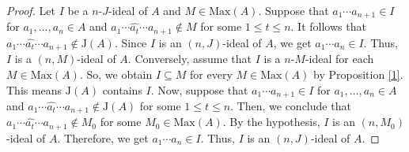 \documentclass[preprint,review,10pt]{amsart}
\theoremstyle{definition}
\theoremstyle{remark}
\numberwithin{equation}{section}
\begin{document}
\begin{proof}
Let $I$ be a $n$-$J$-ideal of $A$ and $M \in \text{Max}(A)$. Suppose that $a_1\cdots a_{n+1} \in I$ for $a_1,\ldots,a_n \in A$ and $a_1\cdots \widehat{a_t} \cdots a_{n+1} \notin M$ for some $1 \leq t \leq n$. It follows that  $a_1\cdots \widehat{a_t} \cdots a_{n+1} \notin \text{J}(A)$. Since $I$ is an $(n,J)$-ideal of $A$, we get $a_1\cdots a_n \in I$. Thus, $I$ is a $(n,M)$-ideal of $A$. Conversely, assume that  $I$ is a $n$-$M$-ideal for each  $M \in \text{Max}(A)$. So, we obtain  $I \subseteq M$ for every $M \in \text{Max}(A)$ by Proposition \ref{1}. This  means $\text{J}(A)$ contains $I$. Now, suppose that $a_1\cdots a_{n+1} \in I$ for $a_1,\ldots,a_n \in A$ and $a_1\cdots \widehat{a_t} \cdots a_{n+1} \notin \text{J}(A)$ for some $1 \leq t \leq n$. Then, we conclude that  $a_1\cdots \widehat{a_t} \cdots a_{n+1} \notin M_0$ for some $M_0 \in \text{Max}(A)$. By the hypothesis, $I$  is an $(n,M_0)$-ideal of $A$. Therefore, we get $a_1\cdots a_n \in I$. Thus,  $I$ is an $(n,J)$-ideal of $A$.
\end{proof}
\end{document}
